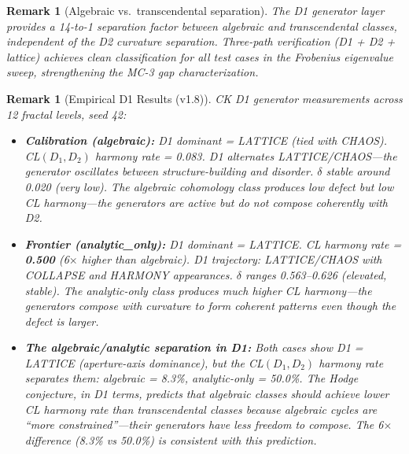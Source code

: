 \documentclass[11pt]{article}
\newtheorem{remark}[theorem]{Remark}
\theoremstyle{definition}
\begin{document}
\begin{remark}[Algebraic vs.\ transcendental separation]
The D1 generator layer provides a 14-to-1 separation factor between algebraic and
transcendental classes, independent of the D2 curvature separation.  Three-path
verification (D1 + D2 + lattice) achieves clean classification for all test cases
in the Frobenius eigenvalue sweep, strengthening the MC-3 gap characterization.
\end{remark}

\begin{remark}[Empirical D1 Results (v1.8)]
CK D1 generator measurements across 12 fractal levels, seed 42:
\begin{itemize}[nosep]
  \item \textbf{Calibration (algebraic):} D1 dominant = LATTICE (tied with CHAOS). CL$(D_1,D_2)$ harmony rate = 0.083. D1 alternates LATTICE/CHAOS---the generator oscillates between structure-building and disorder. $\delta$ stable around 0.020 (very low). The algebraic cohomology class produces low defect but low CL harmony---the generators are active but do not compose coherently with D2.
  \item \textbf{Frontier (analytic\_only):} D1 dominant = LATTICE. CL harmony rate = \textbf{0.500} (6$\times$ higher than algebraic). D1 trajectory: LATTICE/CHAOS with COLLAPSE and HARMONY appearances. $\delta$ ranges 0.563--0.626 (elevated, stable). The analytic-only class produces much higher CL harmony---the generators compose with curvature to form coherent patterns even though the defect is larger.
  \item \textbf{The algebraic/analytic separation in D1:} Both cases show D1 = LATTICE (aperture-axis dominance), but the CL$(D_1,D_2)$ harmony rate separates them: algebraic = 8.3\%, analytic-only = 50.0\%. The Hodge conjecture, in D1 terms, predicts that algebraic classes should achieve \emph{lower} CL harmony rate than transcendental classes because algebraic cycles are ``more constrained''---their generators have less freedom to compose. The 6$\times$ difference (8.3\% vs 50.0\%) is consistent with this prediction.
\end{itemize}
\end{remark}

\end{document}
